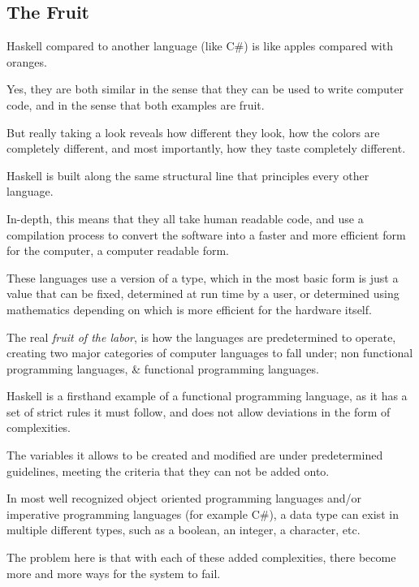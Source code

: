 \documentclass{article}
\begin{document}
\medskip

\subsection{The Fruit}
\hspace{\parindent} 

Haskell compared to another language (like C\#) is like apples compared with oranges. 

\medskip\noindent
Yes, they are both similar in the sense that they can be used to write computer code, and in the sense that both examples are fruit. 

\medskip\noindent
But really taking a look reveals how different they look, how the colors are completely different, and most importantly, how they taste completely different.

\medskip\noindent
Haskell is built along the same structural line that principles every other language. 

\medskip\noindent
In-depth, this means that they all take human readable code, and use a compilation process to convert the software into a faster and more efficient form for the computer, a computer readable form. 

\medskip\noindent
These languages use a version of a type, which in the most basic form is just a value that can be fixed, determined at run time by a user, or determined using mathematics depending on which is more efficient for the hardware itself. 

\medskip\noindent
The real \textit{fruit of the labor}, is how the languages are predetermined to operate, creating two major categories of computer languages to fall under; non functional programming languages, \& functional programming languages. 

\medskip\noindent
Haskell is a firsthand example of a functional programming language, as it has a set of strict rules it must follow, and does not allow deviations in the form of complexities. 

\medskip\noindent
The variables it allows to be created and modified are under predetermined guidelines, meeting the criteria that they can not be added onto. 

\medskip\noindent
In most well recognized object oriented programming languages and/or imperative programming languages (for example C\#), a data type can exist in multiple different types, such as a boolean, an integer, a character, etc. 

\medskip\noindent
The problem here is that with each of these added complexities, there become more and more ways for the system to fail. 
\end{document}
